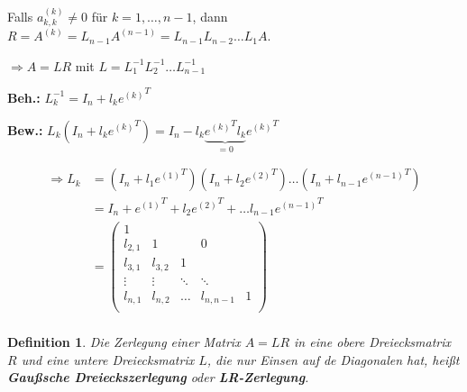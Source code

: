 \documentclass[a4paper,10pt]{scrartcl}
\newtheorem[L]{satz}{Satz}[section]
\newtheorem{definition}{Definition}[section]
\newtheorem[S]{beweis}{Beweis}
\newtheorem[S]{beh}{Behauptung}
\begin{document}
Falls $a_{k,k}^{(k)} \neq 0$ für $k=1, \dots, n-1$, dann $R = A^{(k)} = L_{n-1} A^{(n-1)} = L_{n-1} L_{n-2} \dots L_{1} A$.

$\Rightarrow A = LR$ mit $L=L_1^{-1} L_2^{-1} \dots L_{n-1}^{-1}$

\textbf{Beh.:} $L_k^{-1} = I_n + l_k {e^{(k)}}^T$

\textbf{Bew.:} $L_k (I_n + l_k {e^{(k)}}^T) = I_n - l_k \underbrace{{e^{(k)}}^T l_k}_{=0} {e^{(k)}}^T$

\begin{align*}
  \Rightarrow L_k &= (I_n + l_1 {e^{(1)}}^T) (I_n + l_2 {e^{(2)}}^T) \dots (I_n + l_{n-1} {e^{(n-1)}}^T) \\
                  &= I_n + {e^{(1)}}^T + l_2 {e^{(2)}}^T + \dots l_{n-1} {e^{(n-1)}}^T \\
                  &= \begin{pmatrix}
                       1 \\
                       l_{2,1} & 1 & & 0 \\
                       l_{3,1} & l_{3,2} & 1 \\
                       \vdots & \vdots & \ddots & \ddots \\
                       l_{n,1} & l_{n,2} & \dots & l_{n,n-1} & 1 \\
                     \end{pmatrix} \\
\end{align*}

\begin{definition}
  Die Zerlegung einer Matrix $A = LR$ in eine obere Dreiecksmatrix $R$ und eine untere Dreiecksmatrix $L$, die nur Einsen auf de Diagonalen hat, heißt \textbf{Gaußsche Dreieckszerlegung} oder \textbf{LR-Zerlegung}.
\end{definition}
\end{document}
